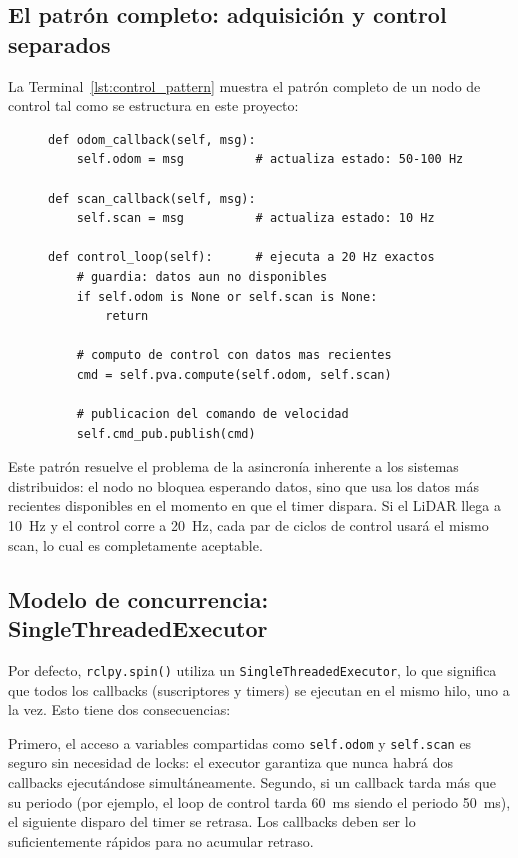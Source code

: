 \subsection{El patrón completo: adquisición y control separados}

La Terminal~\ref{lst:control_pattern} muestra el patrón completo de un nodo de control tal como se estructura en este proyecto:

\begin{figure}[H]
\centering
\begin{lstlisting}[style=python, caption={Patrón completo de nodo de control: suscriptores actualizan estado, timer computa y publica.}, label={lst:control_pattern}]
def odom_callback(self, msg):
    self.odom = msg          # actualiza estado: 50-100 Hz

def scan_callback(self, msg):
    self.scan = msg          # actualiza estado: 10 Hz

def control_loop(self):      # ejecuta a 20 Hz exactos
    # guardia: datos aun no disponibles
    if self.odom is None or self.scan is None:
        return

    # computo de control con datos mas recientes
    cmd = self.pva.compute(self.odom, self.scan)

    # publicacion del comando de velocidad
    self.cmd_pub.publish(cmd)
\end{lstlisting}
\end{figure}

Este patrón resuelve el problema de la asincronía inherente a los sistemas distribuidos: el nodo no bloquea esperando datos, sino que usa los datos más recientes disponibles en el momento en que el timer dispara. Si el LiDAR llega a 10~Hz y el control corre a 20~Hz, cada par de ciclos de control usará el mismo scan, lo cual es completamente aceptable.

\subsection{Modelo de concurrencia: SingleThreadedExecutor}

Por defecto, \texttt{rclpy.spin()} utiliza un \texttt{SingleThreadedExecutor}, lo que significa que todos los callbacks (suscriptores y timers) se ejecutan en el mismo hilo, uno a la vez. Esto tiene dos consecuencias:

Primero, el acceso a variables compartidas como \texttt{self.odom} y \texttt{self.scan} es seguro sin necesidad de locks: el executor garantiza que nunca habrá dos callbacks ejecutándose simultáneamente. Segundo, si un callback tarda más que su periodo (por ejemplo, el loop de control tarda 60~ms siendo el periodo 50~ms), el siguiente disparo del timer se retrasa. Los callbacks deben ser lo suficientemente rápidos para no acumular retraso.

